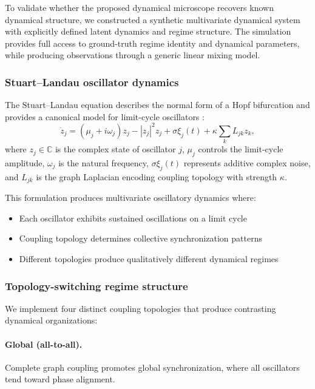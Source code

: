 \documentclass[5p,twocolumn,authoryear]{elsarticle}
\begin{document}
To validate whether the proposed dynamical microscope recovers known dynamical structure, we constructed a synthetic multivariate dynamical system with explicitly defined latent dynamics and regime structure. The simulation provides full access to ground-truth regime identity and dynamical parameters, while producing observations through a generic linear mixing model.

\subsubsection{Stuart--Landau oscillator dynamics}

The Stuart--Landau equation describes the normal form of a Hopf bifurcation and provides a canonical model for limit-cycle oscillators \citep{Strogatz1994}:
\begin{equation}
\dot{z}_j = (\mu_j + i\omega_j)z_j - |z_j|^2 z_j + \sigma\xi_j(t) + \kappa \sum_{k} L_{jk} z_k,
\end{equation}
where $z_j \in \mathbb{C}$ is the complex state of oscillator $j$, $\mu_j$ controls the limit-cycle amplitude, $\omega_j$ is the natural frequency, $\sigma\xi_j(t)$ represents additive complex noise, and $L_{jk}$ is the graph Laplacian encoding coupling topology with strength $\kappa$.

This formulation produces multivariate oscillatory dynamics where:
\begin{itemize}
    \item Each oscillator exhibits sustained oscillations on a limit cycle
    \item Coupling topology determines collective synchronization patterns
    \item Different topologies produce qualitatively different dynamical regimes
\end{itemize}

\subsubsection{Topology-switching regime structure}

We implement four distinct coupling topologies that produce contrasting dynamical organizations:

\paragraph{Global (all-to-all).} Complete graph coupling promotes global synchronization, where all oscillators tend toward phase alignment.
\end{document}
